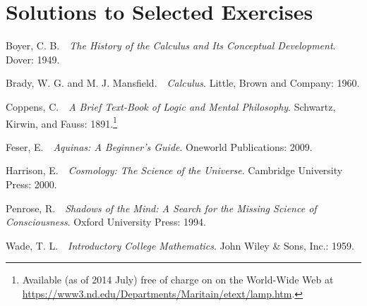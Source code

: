 \documentclass[twocolumn,letterpaper]{book}
\begin{document}

\frontmatter



\tableofcontents



\mainmatter





\appendix

\chapter{Solutions to Selected Exercises}





\backmatter



\begin{thebibliography}{}


 Boyer, C. B.\ \ {\it The History of the
   Calculus and Its Conceptual Development}. Dover: 1949.

 Brady, W. G. and
   M. J. Mansfield.\ \ {\it Calculus}. Little, Brown and Company: 1960.

 Coppens, C.\ \ {\it A Brief
   Text-Book of Logic and Mental Philosophy}. Schwartz, Kirwin, and Fauss:
   1891.\footnote{%
      Available (as of 2014 July) free of charge on on the World-Wide Web at
      \url{https://www3.nd.edu/Departments/Maritain/etext/lamp.htm}.%
   }

 Feser, E.\ \ {\it Aquinas: A Beginner's
   Guide}. Oneworld Publications: 2009.

 Harrison, E.\ \ {\it Cosmology:
   The Science of the Universe}. Cambridge University Press: 2000.

 Penrose, R.\ \ {\it Shadows of the
   Mind: A Search for the Missing Science of Consciousness}. Oxford University
   Press: 1994.

 Wade, T. L.\ \ {\it Introductory College
   Mathematics}. John Wiley \& Sons, Inc.: 1959.

\end{thebibliography}
\end{document}

